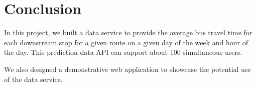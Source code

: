 \chapter{Conclusion}

\par In this project, we built a data service to provide the average bus travel time for each downstream stop for a given route on a given day of the week and hour of the day. This prediction data API can support about 100 simultaneous users.

\par We also designed a demonstrative web application to showcase the potential use of the data service.

